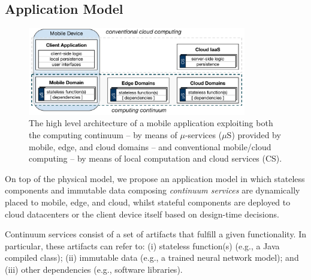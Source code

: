 



\subsection{Application Model}\label{sec:application_model}

\begin{figure}[tbp]
	\includegraphics[width=0.85\textwidth]{figs/Continuum-arch}
	\caption{The high level architecture of a mobile application exploiting both the computing continuum -- by means of $\mu$-services ($\mu$S) provided by mobile, edge, and cloud domains -- and conventional mobile/cloud computing -- by means of local computation and cloud services (CS).}
	\label{fig:Continuum-arch}
\end{figure}

On top of the physical model, we propose an application model in which stateless components and immutable data composing \textit{continuum services} are dynamically placed to mobile, edge, and cloud,
whilst 
stateful components are deployed to cloud datacenters or the client device itself based on design-time decisions.

Continuum services consist of a set of artifacts that fulfill a given functionality. In particular, these artifacts can refer to: (i) stateless function(s) (e.g., a Java compiled class); (ii) immutable data (e.g., a trained neural network model); and (iii) other dependencies (e.g., software libraries).

